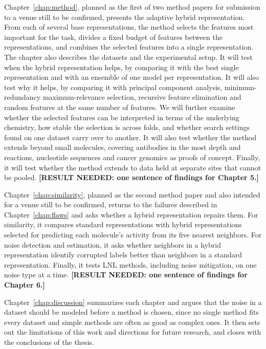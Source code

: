 Chapter~\ref{chap:method}, planned as the first of two method papers for submission to a venue still to be confirmed, presents the adaptive hybrid representation. From each of several base representations, the method selects the features most important for the task, divides a fixed budget of features between the representations, and combines the selected features into a single representation. The chapter also describes the datasets and the experimental setup. It will test when the hybrid representation helps, by comparing it with the best single representation and with an ensemble of one model per representation. It will also test why it helps, by comparing it with principal component analysis, minimum-redundancy maximum-relevance selection, recursive feature elimination and random features at the same number of features. We will further examine whether the selected features can be interpreted in terms of the underlying chemistry, how stable the selection is across folds, and whether search settings found on one dataset carry over to another. It will also test whether the method extends beyond small molecules, covering antibodies in the most depth and reactions, nucleotide sequences and cancer genomics as proofs of concept. Finally, it will test whether the method extends to data held at separate sites that cannot be pooled. \textbf{[RESULT NEEDED: one sentence of findings for Chapter 5.]}

Chapter~\ref{chap:similarity}, planned as the second method paper and also intended for a venue still to be confirmed, returns to the failures described in Chapter~\ref{chap:flaws} and asks whether a hybrid representation repairs them. For similarity, it compares standard representations with hybrid representations selected for predicting each molecule's activity from its five nearest neighbors. For noise detection and estimation, it asks whether neighbors in a hybrid representation identify corrupted labels better than neighbors in a standard representation. Finally, it tests LNL methods, including noise mitigation, on one noise type at a time. \textbf{[RESULT NEEDED: one sentence of findings for Chapter 6.]}

Chapter~\ref{chap:discussion} summarizes each chapter and argues that the noise in a dataset should be modeled before a method is chosen, since no single method fits every dataset and simple methods are often as good as complex ones. It then sets out the limitations of this work and directions for future research, and closes with the conclusions of the thesis. %

